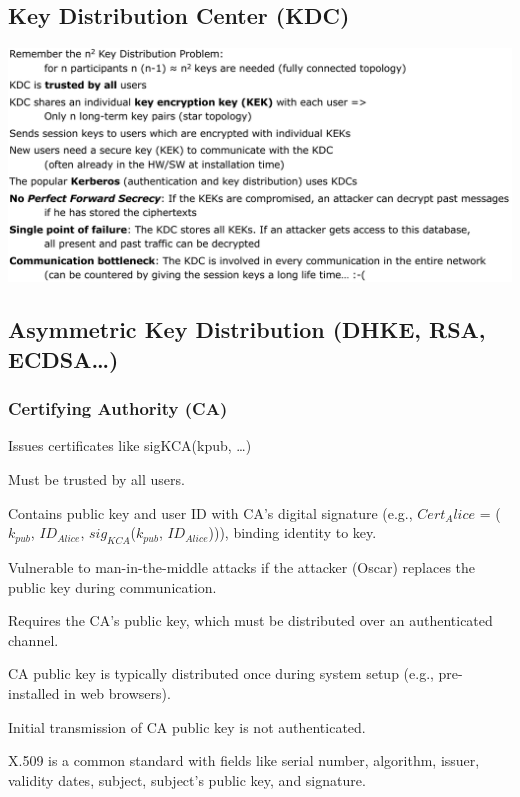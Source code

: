 \documentclass[
  10pt,
  a4paper,
]{article}
\begin{document}
\begin{multicols*}{2}
\subsection{Key Distribution Center
(KDC)}\label{key-distribution-center-kdc}

\includegraphics{images/crypto/image-32.png}

\subsection{Asymmetric Key Distribution (DHKE, RSA,
ECDSA\ldots)}\label{asymmetric-key-distribution-dhke-rsa-ecdsa}

\subsubsection{Certifying Authority (CA)}\label{certifying-authority-ca}

{\small\begin{description}[parsep=2mm,labelsep=2pt,labelwidth=8pt]
  \item[Role:] Issues certificates like sigKCA(kpub, …)
  \item[Trust:] Must be trusted by all users.
  \item[Certificate:] Contains public key and user ID with CA's digital signature (e.g., $Cert_Alice$ = ($k_{pub}$, $ID_{Alice}$, $sig_{KCA}$($k_{pub}$, $ID_{Alice}$))), binding identity to key.
  \item[Security Risk:] Vulnerable to man-in-the-middle attacks if the attacker (Oscar) replaces the public key during communication.
  \item[Verification:] Requires the CA's public key, which must be distributed over an authenticated channel.
  \item[Distribution:] CA public key is typically distributed once during system setup (e.g., pre-installed in web browsers).
  \item[Weakness:] Initial transmission of CA public key is not authenticated.
  \item[Standard:] X.509 is a common standard with fields like serial number, algorithm, issuer, validity dates, subject, subject's public key, and signature.
\end{description}}


\end{multicols*}
\end{document}
